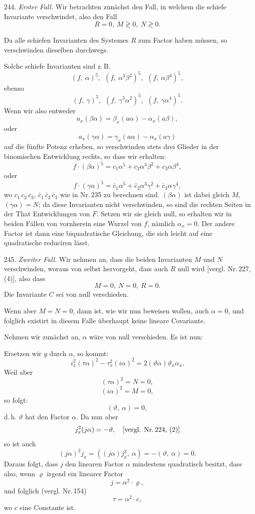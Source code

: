 244. \textit{Erster Fall.} Wir betrachten zun\"achst den Fall, in welchem die schiefe Invariante verschwindet, also den Fall
\[
R=0,\ M\gtrless 0,\ N\gtrless 0.
\]

Da alle schiefen Invarianten des Systemes $R$ zum Factor haben m\"ussen, so verschwinden dieselben durchwegs.

Solche schiefe Invarianten sind z.\,B.
\[
(f,\ \alpha)^5,\ \ (f,\ \alpha^3\beta^2)^5,\ \ (f,\ \alpha\beta^4)^5,
\]
ebenso
\[
(f,\ \gamma)^5,\ \ (f,\ \gamma^3\alpha^2)^5,\ \ (f,\ \gamma\alpha^4)^5.
\]
Wenn wir also entweder
\[
a_x(\beta\alpha) = \beta_x(a\alpha) - \alpha_x(a\beta),
\]
oder
\[
a_x(\gamma\alpha) = \gamma_x(a\alpha) - \alpha_x(a\gamma)
\]
auf die f\"unfte Potenz erheben, so verschwinden stets drei Glieder in der binomischen Entwicklung rechts, so dass wir erhalten:
\[
f\cdot(\beta\alpha)^5 = c_1\alpha^5 + c_2\alpha^3\beta^2 + c_3\alpha\beta^4,
\]
oder
\[
f\cdot(\gamma\alpha)^5 = \bar c_1\alpha^5 + \bar c_2\alpha^3\gamma^2 + \bar c_3\alpha\gamma^4,
\]
wo $c_1\,c_2\,c_3$, $\bar c_1\,\bar c_2\,\bar c_3$ wie in Nr.\,235 zu berechnen sind. $(\beta\alpha)$ ist dabei gleich $M$, $(\gamma\alpha) = N$; da diese Invarianten nicht verschwinden, so sind die rechten Seiten in der That Entwicklungen von $F$. Setzen wir sie gleich null, so erhalten wir in beiden F\"allen von vornherein eine Wurzel von $f$, n\"amlich $\alpha_x=0$. Der andere Factor ist dann eine biquadratische Gleichung, die sich leicht auf eine quadratische reduciren l\"asst.

245. \textit{Zweiter Fall.} Wir nehmen an, dass die beiden Invarianten $M$ und $N$ verschwinden, woraus von selbst hervorgeht, dass auch $R$ null wird [vergl. Nr.\,227, (4)], also dass
\[
M=0,\ N=0,\ R=0.
\]
Die Invariante $C$ sei von null verschieden.

Wenn aber $M=N=0$, dann ist, wie wir nun beweisen wollen, auch $\alpha=0$, und folglich existirt in diesem Falle \"uberhaupt keine lineare Covariante.

Nehmen wir zun\"achst an, $\alpha$ w\"are von null verschieden. Es ist nun:


Ersetzen wir $y$ durch $\alpha$, so kommt:
\[
i_x^2(\tau\alpha)^2 - \tau_x^2(i\alpha)^2 = 2(\vartheta\alpha)\vartheta_x\alpha_x.
\]
Weil aber
\[
(\tau\alpha)^2 = N = 0,
\]
\[
(i\alpha)^2 = M = 0,
\]
so folgt:
\[
(\vartheta,\ \alpha) = 0,
\]
d.\,h. $\vartheta$ hat den Factor $\alpha$. Da nun aber
\[
j_x^2(j\alpha) = -\vartheta, \quad \text{[vergl. Nr.\,224, (2)]}
\]
so ist auch
\[
(j\alpha)^2 j_x = ((j\alpha)j_x^2,\ \alpha) = -(\vartheta,\ \alpha) = 0.
\]
Daraus folgt, dass $j$ den linearen Factor $\alpha$ mindestens quadratisch besitzt, dass also, wenn $\varrho$ irgend ein linearer Factor
\[
j = \alpha^2\cdot\varrho,
\]
und folglich (vergl. Nr.\,154)
\[
\tau = \alpha^2\cdot c,
\]
wo $c$ eine Constante ist.


